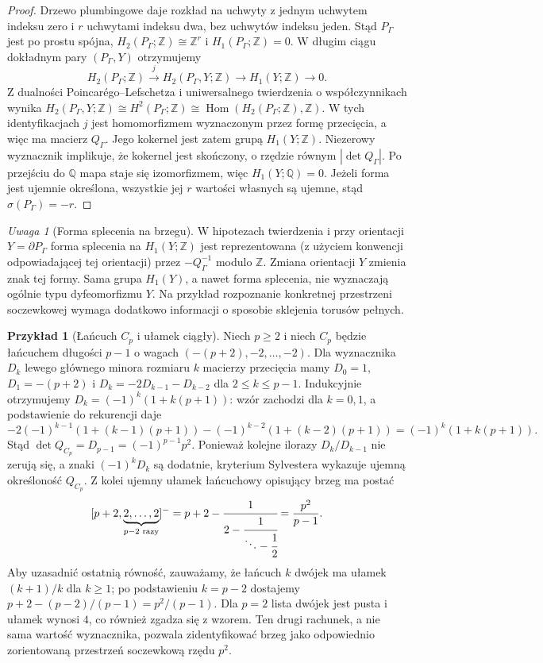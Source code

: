 \documentclass[11pt,a4paper]{report}
\numberwithin{equation}{section}
\theoremstyle{plain}
\theoremstyle{definition}
\newtheorem{przyklad}[twierdzenie]{Przykład}
\theoremstyle{remark}
\newtheorem{uwaga}[twierdzenie]{Uwaga}
\begin{document}
\begin{proof}
Drzewo plumbingowe daje rozkład na uchwyty z jednym uchwytem indeksu
zero i $r$ uchwytami indeksu dwa, bez uchwytów indeksu jeden.
Stąd $P_\Gamma$ jest po prostu spójna,
$H_2(P_\Gamma;\mathbb Z)\cong\mathbb Z^r$ i
$H_1(P_\Gamma;\mathbb Z)=0$. W długim ciągu dokładnym pary
$(P_\Gamma,Y)$ otrzymujemy
\[
 H_2(P_\Gamma;\mathbb Z)\xrightarrow{j}
 H_2(P_\Gamma,Y;\mathbb Z)\longrightarrow
 H_1(Y;\mathbb Z)\longrightarrow0.
\]
Z dualności Poincar\'ego--Lefschetza i uniwersalnego twierdzenia
o współczynnikach wynika
$H_2(P_\Gamma,Y;\mathbb Z)\cong H^2(P_\Gamma;\mathbb Z)
\cong\operatorname{Hom}(H_2(P_\Gamma;\mathbb Z),\mathbb Z)$.
W tych identyfikacjach $j$ jest homomorfizmem wyznaczonym przez
formę przecięcia, a więc ma macierz $Q_\Gamma$. Jego kokernel
jest zatem grupą $H_1(Y;\mathbb Z)$. Niezerowy wyznacznik
implikuje, że kokernel jest skończony, o rzędzie równym
$|\det Q_\Gamma|$. Po przejściu do $\mathbb Q$ mapa staje się
izomorfizmem, więc $H_1(Y;\mathbb Q)=0$.
Jeżeli forma jest ujemnie określona, wszystkie jej $r$
wartości własnych są ujemne, stąd $\sigma(P_\Gamma)=-r$.
\end{proof}

\begin{uwaga}[Forma splecenia na brzegu]
W hipotezach twierdzenia i przy orientacji $Y=\partial P_\Gamma$
forma splecenia na $H_1(Y;\mathbb Z)$ jest reprezentowana
(z użyciem konwencji odpowiadającej tej orientacji) przez
$-Q_\Gamma^{-1}$ modulo $\mathbb Z$. Zmiana orientacji $Y$
zmienia znak tej formy. Sama grupa $H_1(Y)$, a nawet
forma splecenia, nie wyznaczają ogólnie typu dyfeomorfizmu $Y$.
Na przykład rozpoznanie konkretnej przestrzeni soczewkowej
wymaga dodatkowo informacji o sposobie sklejenia torusów pełnych.
\end{uwaga}

\begin{przyklad}[Łańcuch $C_p$ i ułamek ciągły]
\label{ex:tg-syn-cp}
Niech $p\ge2$ i niech $C_p$ będzie łańcuchem długości $p-1$
o wagach $(-(p+2),-2,\ldots,-2)$. Dla wyznacznika
$D_k$ lewego głównego minora rozmiaru $k$ macierzy przecięcia
mamy $D_0=1$, $D_1=-(p+2)$ i
$D_k=-2D_{k-1}-D_{k-2}$ dla $2\le k\le p-1$.
Indukcyjnie otrzymujemy
$D_k=(-1)^k(1+k(p+1))$: wzór zachodzi dla $k=0,1$,
a podstawienie do rekurencji daje
\[
 -2(-1)^{k-1}(1+(k-1)(p+1))
 -(-1)^{k-2}(1+(k-2)(p+1))
 =(-1)^k(1+k(p+1)).
\]
Stąd $\det Q_{C_p}=D_{p-1}=(-1)^{p-1}p^2$.
Ponieważ kolejne ilorazy $D_k/D_{k-1}$ nie zerują się,
a znaki $(-1)^kD_k$ są dodatnie, kryterium Sylvestera
wykazuje ujemną określoność $Q_{C_p}$.
Z kolei ujemny ułamek łańcuchowy opisujący brzeg ma postać
\[
[p+2,\underbrace{2,\ldots,2}_{p-2\text{ razy}}]^-
=p+2-\cfrac{1}{2-\cfrac{1}{\ddots-\cfrac12}}
=\frac{p^2}{p-1}.
\]
Aby uzasadnić ostatnią równość, zauważamy, że łańcuch
$k$ dwójek ma ułamek $(k+1)/k$ dla $k\ge1$;
po podstawieniu $k=p-2$ dostajemy
$p+2-(p-2)/(p-1)=p^2/(p-1)$.
Dla $p=2$ lista dwójek jest pusta i ułamek wynosi $4$,
co również zgadza się z wzorem.
Ten drugi rachunek, a nie sama wartość wyznacznika,
pozwala zidentyfikować brzeg jako odpowiednio zorientowaną
przestrzeń soczewkową rzędu $p^2$.
\end{przyklad}
\end{document}
